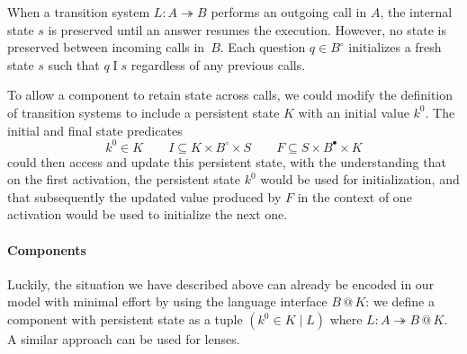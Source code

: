 \documentclass[acmsmall,screen,review,anonymous,nonacm]{acmart}
\newcommand{\que}{\circ}
\newcommand{\ans}{\bullet}
\newcommand{\intl}[1]{#1^0}
\begin{document}
When a transition system $L : A \twoheadrightarrow B$
performs an outgoing call in $A$,
the internal state $s$ is preserved
until an answer resumes the execution.
However,
no state is preserved between incoming calls in~$B$.
Each question $q \in B^\que$ initializes a fresh state $s$
such that $q \mathrel{I} s$
regardless of any previous calls. %

To allow a component to retain state across calls,
we could modify the definition of transition systems
to include a persistent state $K$ with an initial value $\intl{k}$.
The initial and final state predicates
\begin{equation} \label{eqn:psts}
  \intl{k} \in K
  \qquad
  I \subseteq K \times B^\que \times S
  \qquad
  F \subseteq S \times B^\ans \times K
\end{equation}
could then access and update this persistent state,
with the understanding that on the first activation,
the persistent state $\intl{k}$ would be used for initialization,
and that subsequently the updated value produced by $F$
in the context of one activation
would be used to initialize the next one.

\paragraph{Components} %

Luckily,
the situation we have described above
can already be encoded in our model with minimal effort
by using the language interface $B \mathbin@ K$:
we define a component with persistent state as a tuple
$(\intl{k} \in K \mid L)$
where
$L : A \twoheadrightarrow B \mathbin@ K$.
A similar approach can be used for lenses.
\end{document}

